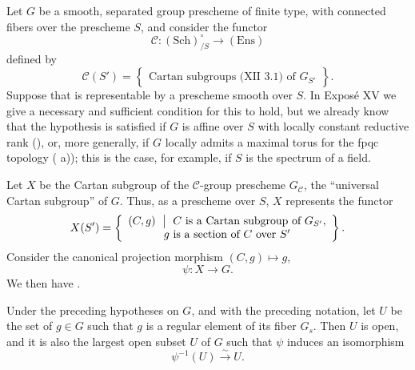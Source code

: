 Let \(G\) be a smooth, separated group prescheme of finite type, with
connected fibers over the prescheme \(S\), and consider the functor
\[
  \mathcal C:(\mathrm{Sch})^\circ_{/S}\longrightarrow(\mathrm{Ens})
\]
defined by
\[
  \mathcal C(S')
  =
  \left\{
    \begin{array}{c}
      \text{Cartan subgroups (XII~3.1) of \(G_{S'}\)}
    \end{array}
  \right\}.
\]
Suppose that  is representable by a prescheme smooth over
\(S\). In Exposé XV we give a necessary and sufficient condition for
this to hold, but we already know that the hypothesis is satisfied if
\(G\) is affine over \(S\) with locally constant reductive rank
(), or, more generally, if \(G\) locally admits a maximal torus
for the fpqc topology ( a)); this is the case, for example, if
\(S\) is the spectrum of a field.

Let \(X\) be the Cartan subgroup of the \(\mathcal C\)-group
prescheme \(G_{\mathcal C}\), the ``universal Cartan subgroup'' of
\(G\). Thus, as a prescheme over \(S\), \(X\) represents the functor
\[
  X(S')
  =
  \left\{
    \begin{array}{c}
      (C,g)\ \bigm|\ C\text{ is a Cartan subgroup of }G_{S'},\\
      g\text{ is a section of }C\text{ over }S'
    \end{array}
  \right\}.
\]
Consider the canonical projection morphism \((C,g)\mapsto g\),
\[
  \psi:X\longrightarrow G.
\]
We then have .

\begin{theorem}
Under the preceding hypotheses on \(G\), and with the preceding
notation, let \(U\) be the set of \(g\in G\) such that \(g\) is a
regular element of its fiber \(G_s\). Then \(U\) is open, and it is
also the largest open subset \(U\) of \(G\) such that \(\psi\)
induces an isomorphism
\[
  \psi^{-1}(U)\xrightarrow{\sim}U.
\]
\end{theorem}

